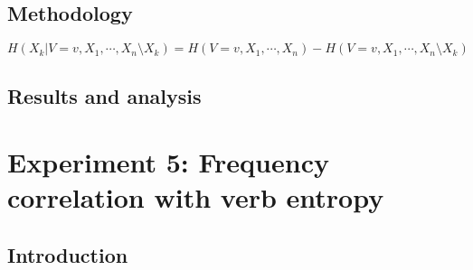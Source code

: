 



\subsection{Methodology}

$$H(X_{k} | V = v, X_{1},\cdots,X_{n} \setminus X_{k}) = H( V = v, X_{1},\cdots,X_{n}) - H( V = v, X_{1},\cdots,X_{n}\setminus X_{k})$$

\subsection{Results and analysis}

\section{Experiment 5: Frequency correlation with verb entropy}\label{sec:exp5-verb-entropy}

\subsection{Introduction}

